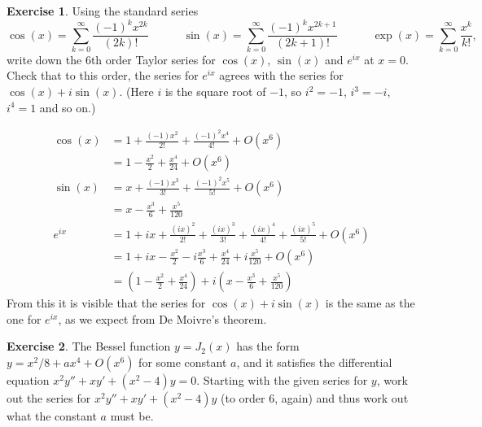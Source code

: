 \documentclass[a4paper]{amsart}
\theoremstyle{definition}
\newtheorem{exercise}{Exercise}[section]
\newenvironment{solution}{{\noindent \bf Solution:}}{}
\begin{document}
\begin{exercise}\label{ex-taylor-demoivre}
Using the standard series
 \[ \cos(x) = \sum_{k=0}^\infty \frac{(-1)^kx^{2k}}{(2k)!} 
    \hspace{3em}
    \sin(x) = \sum_{k=0}^\infty \frac{(-1)^kx^{2k+1}}{(2k+1)!} 
    \hspace{3em}
    \exp(x) = \sum_{k=0}^\infty \frac{x^k}{k!},
 \]
 write down the $6$th order Taylor series for $\cos(x)$,
 $\sin(x)$ and $e^{ix}$ at $x=0$.  Check that to this order, the
 series for $e^{ix}$ agrees with the series for
 $\cos(x)+i\sin(x)$.  (Here $i$ is the square root of $-1$,
 so $i^2=-1$, $i^3=-i$, $i^4=1$ and so on.)
\end{exercise}
\begin{solution}
\begin{align*}
  \cos(x)
   &= 1 + \frac{(-1)x^2}{2!} + \frac{(-1)^2x^4}{4!} + O(x^6)\\
   &= 1 - \frac{x^2}{2} + \frac{x^4}{24} + O(x^6) \\
  \sin(x)
   &= x + \frac{(-1)x^3}{3!} + \frac{(-1)^2x^5}{5!} + O(x^6)\\
   &= x - \frac{x^3}{6} + \frac{x^5}{120} \\
  e^{ix} 
   &= 1 + ix + \frac{(ix)^2}{2!} + \frac{(ix)^3}{3!} +
       \frac{(ix)^4}{4!} + \frac{(ix)^5}{5!} + O(x^6) \\
   &= 1 + ix - \frac{x^2}{2} - i\frac{x^3}{6} + 
       \frac{x^4}{24} + i \frac{x^5}{120} + O(x^6) \\
   &= \left(1 - \frac{x^2}{2} + \frac{x^4}{24}\right) + 
      i\left(x - \frac{x^3}{6} + \frac{x^5}{120}\right)
 \end{align*}
 From this it is visible that the series for
 $\cos(x)+i\sin(x)$ is the same as the one for $e^{ix}$, as
 we expect from De Moivre's theorem.
\end{solution}
\begin{exercise}\label{ex-taylor-bessel}
The Bessel function $y=J_2(x)$ has the form
 $y=x^2/8+ax^4+O(x^6)$ for some constant $a$, and it
 satisfies the differential equation $x^2y''+xy'+(x^2-4)y=0$.
 Starting with the given series for $y$, work out the series
 for $x^2y''+xy'+(x^2-4)y$ (to order $6$, again) and thus
 work out what the constant $a$ must be.
\end{exercise}
\end{document}
